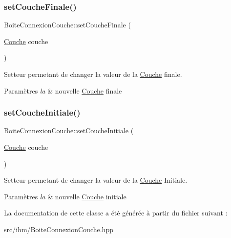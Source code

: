 \subsubsection{\texorpdfstring{set\+Couche\+Finale()}{setCoucheFinale()}}
{\footnotesize\ttfamily Boite\+Connexion\+Couche\+::set\+Couche\+Finale (\begin{DoxyParamCaption}\item[{\hyperlink{class_couche}{Couche}}]{couche }\end{DoxyParamCaption})}



Setteur permetant de changer la valeur de la \hyperlink{class_couche}{Couche} finale. 


\begin{DoxyParams}{Paramètres}
{\em la} & nouvelle \hyperlink{class_couche}{Couche} finale \\
\hline
\end{DoxyParams}
\mbox{\label{class_boite_connexion_couche_aca89aac7d4ae0ba89828c6d542790925}} 
\subsubsection{\texorpdfstring{set\+Couche\+Initiale()}{setCoucheInitiale()}}
{\footnotesize\ttfamily Boite\+Connexion\+Couche\+::set\+Couche\+Initiale (\begin{DoxyParamCaption}\item[{\hyperlink{class_couche}{Couche}}]{couche }\end{DoxyParamCaption})}



Setteur permetant de changer la valeur de la \hyperlink{class_couche}{Couche} Initiale. 


\begin{DoxyParams}{Paramètres}
{\em la} & nouvelle \hyperlink{class_couche}{Couche} initiale \\
\hline
\end{DoxyParams}


La documentation de cette classe a été générée à partir du fichier suivant \+:\begin{DoxyCompactItemize}
\item 
src/ihm/Boite\+Connexion\+Couche.\+hpp\end{DoxyCompactItemize}
